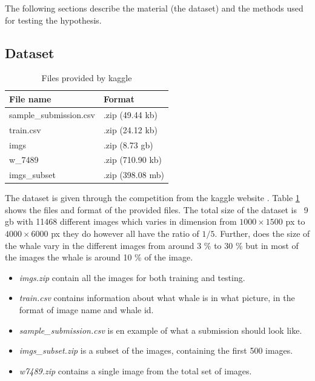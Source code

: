 The following sections describe the material (the dataset) and the methods used for testing the hypothesis.

\subsection{Dataset}
\label{sec:discribdata}
\begin{table}
	\centering
	\caption{Files provided by kaggle}
	\label{table:dataset-files}
	\begin{tabular}{|l|l|}
		\hline
		File name              & Format           \\ \hline \hline
		sample\_submission.csv & .zip (49.44 kb)  \\ \hline
		train.csv              & .zip (24.12 kb)  \\ \hline
		imgs                   & .zip (8.73 gb)   \\ \hline
		w\_7489                & .zip (710.90 kb) \\ \hline
		imgs\_subset           & .zip (398.08 mb) \\ \hline
	\end{tabular}
\end{table}

The dataset is given through the competition from the kaggle website \cite{kaggle:competition}. Table \ref{table:dataset-files} shows the files and format of the provided files. The total size of the dataset is ~9 gb with 11468 different images which varies in dimension from \(1000 \times 1500\) px to \(4000 \times 6000\) px they do however all have the ratio of \(1/5\).
Further, does the size of the whale vary in the different images from around 3 \% to 30 \% but in most of the images the whale is around 10 \% of the image.

\begin{itemize}
	\item \emph{imgs.zip} contain all the images for both training and testing.
	\item \emph{train.csv} contains information about what whale is in what picture, in the format of image name and whale id.
	\item \emph{sample\_submission.csv} is en example of what a submission should look like.
	\item \emph{imgs\_subset.zip} is a subset of the images, containing the first 500 images.
	\item \emph{w\-7489.zip} contains a single image from the total set of images.
\end{itemize}

